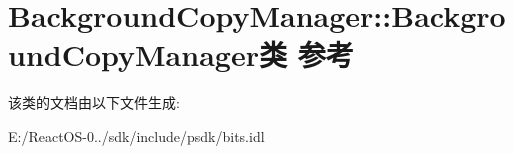 \hypertarget{class_background_copy_manager_1_1_background_copy_manager}{}\section{Background\+Copy\+Manager\+:\+:Background\+Copy\+Manager类 参考}
\label{class_background_copy_manager_1_1_background_copy_manager}


该类的文档由以下文件生成\+:\begin{DoxyCompactItemize}
\item 
E\+:/\+React\+O\+S-\/0../sdk/include/psdk/bits.\+idl\end{DoxyCompactItemize}
